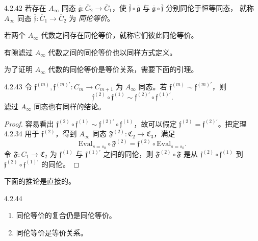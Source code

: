 \begin{definition}{4.2.42}\label{def:4-2-42}
若存在 $A_\infty$ 同态
$\overline{\mathfrak g}\colon\overline C_2\to\overline C_1$，使
$\overline{\mathfrak f}\circ\overline{\mathfrak g}$ 与
$\overline{\mathfrak g}\circ\overline{\mathfrak f}$ 分别同伦于恒等同态，
就称 $A_\infty$ 同态
$\overline{\mathfrak f}\colon\overline C_1\to\overline C_2$ 为
\emph{同伦等价}。

若两个 $A_\infty$ 代数之间存在同伦等价，就称它们彼此同伦等价。
\end{definition}

有隙滤过 $A_\infty$ 代数之间的同伦等价也以同样方式定义。

为了证明 $A_\infty$ 代数的同伦等价是等价关系，需要下面的引理。

\begin{lemma}{4.2.43}\label{lem:4-2-43}
令
$\mathfrak f^{(m)},
 \mathfrak f^{(m)\prime}\colon
 C_m\to C_{m+1}$ 为 $A_\infty$ 同态。若
$\mathfrak f^{(m)}\sim
 \mathfrak f^{(m)\prime}$，则
\[
 \mathfrak f^{(2)}\circ\mathfrak f^{(1)}
 \sim
 \mathfrak f^{(2)\prime}\circ
 \mathfrak f^{(1)\prime}.
\]
滤过 $A_\infty$ 同态也有同样的结论。
\end{lemma}

\begin{proof}
容易看出
$\mathfrak f^{(2)}\circ\mathfrak f^{(1)}
 \sim\mathfrak f^{(2)\prime}\circ\mathfrak f^{(1)}$，故可以假定
$\mathfrak f^{(2)}=\mathfrak f^{(2)\prime}$。把定理 4.2.34 用于
$\mathfrak f^{(2)}$，得到 $A_\infty$ 同态
$\mathfrak F^{(2)}\colon\mathfrak C_2\to\mathfrak C_3$，满足
\[
 \mathrm{Eval}_{s=s_0}\circ\mathfrak F^{(2)}
 =\mathfrak f^{(2)}\circ\mathrm{Eval}_{s=s_0}.
\]
令 $\mathfrak F\colon C_1\to\mathfrak C_2$ 为
$\mathfrak f^{(1)}$ 与 $\mathfrak f^{(1)\prime}$ 之间的同伦，则
$\mathfrak F^{(2)}\circ\mathfrak F$ 是从
$\mathfrak f^{(2)}\circ\mathfrak f^{(1)}$ 到
$\mathfrak f^{(2)}\circ\mathfrak f^{(1)\prime}$ 的同伦。
\end{proof}

下面的推论是直接的。

\begin{corollary}{4.2.44}\label{cor:4-2-44}
\begin{enumerate}[label=\textup{(\arabic*)},leftmargin=2.8em]
 \item 同伦等价的复合仍是同伦等价。
 \item 同伦等价是等价关系。
\end{enumerate}
\end{corollary}

